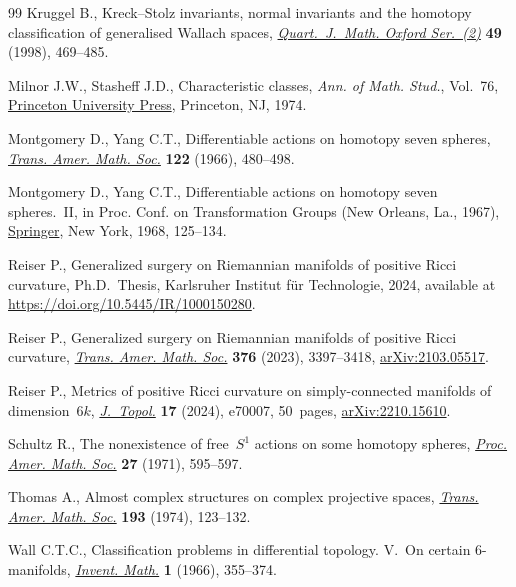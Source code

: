 \documentclass[10pt,a4paper]{amsart}
\numberwithin{equation}{section}
\theoremstyle{definition}
\numberwithin{table}{section}
\begin{document}
\begin{thebibliography}{99}
Kruggel B., Kreck--{S}tolz invariants, normal invariants and the homotopy
  classification of generalised {W}allach spaces,
  \href{https://doi.org/10.1093/qmathj/49.4.469}{\textit{Quart.~J.~Math. Oxford
  Ser.~(2)}} \textbf{49} (1998), 469--485.

Milnor J.W., Stasheff J.D., Characteristic classes, \textit{Ann. of Math.
  Stud.}, Vol.~76, \href{https://doi.org/10.1515/9781400881826}{Princeton
  University Press}, Princeton, NJ, 1974.

Montgomery D., Yang C.T., Differentiable actions on homotopy seven spheres,
  \href{https://doi.org/10.2307/1994562}{\textit{Trans. Amer. Math. Soc.}}
  \textbf{122} (1966), 480--498.

Montgomery D., Yang C.T., Differentiable actions on homotopy seven
  spheres.~{II}, in Proc. {C}onf. on {T}ransformation {G}roups ({N}ew
  {O}rleans, {L}a., 1967),
  \href{https://doi.org/10.1007/978-3-642-46141-5_4}{Springer}, New York, 1968,
  125--134.

Reiser P., Generalized surgery on {R}iemannian manifolds of positive {R}icci
  curvature, Ph.D.~Thesis, {K}arlsruher Institut f\"ur Technologie, 2024,
  available at \url{https://doi.org/10.5445/IR/1000150280}.

Reiser P., Generalized surgery on {R}iemannian manifolds of positive {R}icci
  curvature, \href{https://doi.org/10.1090/tran/8789}{\textit{Trans. Amer.
  Math. Soc.}} \textbf{376} (2023), 3397--3418,
  \href{https://arxiv.org/abs/2103.05517}{arXiv:2103.05517}.

Reiser P., Metrics of positive {R}icci curvature on simply-connected manifolds
  of dimension~{$6k$},
  \href{https://doi.org/10.1112/topo.70007}{\textit{J.~Topol.}} \textbf{17}
  (2024), e70007, 50~pages,
  \href{https://arxiv.org/abs/2210.15610}{arXiv:2210.15610}.

Schultz R., The nonexistence of free~{$S^{1}$} actions on some homotopy
  spheres, \href{https://doi.org/10.2307/2036505}{\textit{Proc. Amer. Math.
  Soc.}} \textbf{27} (1971), 595--597.

Thomas A., Almost complex structures on complex projective spaces,
  \href{https://doi.org/10.2307/1996904}{\textit{Trans. Amer. Math. Soc.}}
  \textbf{193} (1974), 123--132.

Wall C.T.C., Classification problems in differential topology. {V}.~{O}n
  certain {$6$}-manifolds,
  \href{https://doi.org/10.1007/BF01389738}{\textit{Invent. Math.}} \textbf{1}
  (1966), 355--374.


\end{thebibliography}
\end{document}
